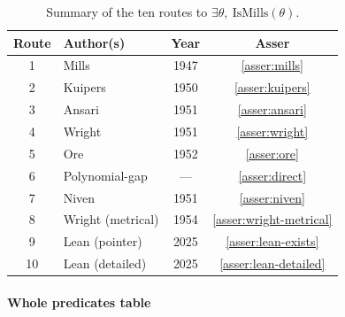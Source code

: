\documentclass[11pt,reqno]{amsart}
\theoremstyle{blueplain}
\newcounter{asser}
\numberwithin{equation}{section}
\begin{document}
\begin{table}[H]
	\centering
	\caption{Summary of the ten routes to \(\exists\theta,\ \mathrm{IsMills}(\theta)\).}
	\label{tab:routes}
	{\small
		\begin{tabular}{|c|l|c|c|}
			\hline
			\textbf{Route} & \textbf{Author(s)} & \textbf{Year} & \textbf{Asser} \\
			\hline
			1 & Mills & 1947 & \cref{asser:mills} \\
			2 & Kuipers & 1950 & \cref{asser:kuipers} \\
			3 & Ansari & 1951 & \cref{asser:ansari} \\
			4 & Wright & 1951 & \cref{asser:wright} \\
			5 & Ore & 1952 & \cref{asser:ore} \\
			6 & Polynomial-gap & --- & \cref{asser:direct} \\
			7 & Niven & 1951 & \cref{asser:niven} \\
			8 & Wright (metrical) & 1954 & \cref{asser:wright-metrical} \\
			9 & Lean (pointer) & 2025 & \cref{asser:lean-exists} \\
			10 & Lean (detailed) & 2025 & \cref{asser:lean-detailed} \\
			\hline
		\end{tabular}
	}
\end{table}
\paragraph{Whole predicates table}

\text{\ } \newline
\text{\ } \vspace{0.3in}\text{\ }
\end{document}
